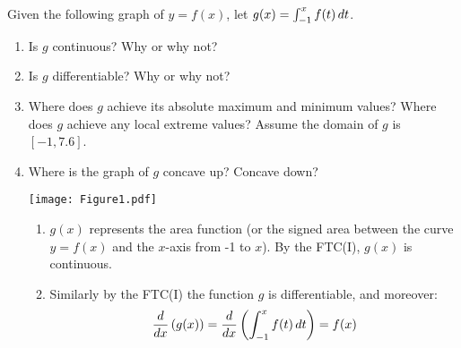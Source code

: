 \documentclass[handout,nooutcomes]{ximera}
\begin{document}
\newpage







\begin{problem}
Given the following graph of $y=f(x)$, let $g(x) = \int_{-1}^x f(t) \,d t$.
	\begin{enumerate}
	
	\item  Is $g$ continuous?  Why or why not?
		
		
		
		
	\item  Is $g$ differentiable?  Why or why not?
		
		
		
		
	\item  Where does $g$ achieve its absolute maximum and minimum values?  Where does $g$ achieve any local extreme values?  Assume the domain of $g$ is $[-1,7.6]$.
		
		
		
		
	\item  Where is the graph of $g$ concave up?  Concave down?
		
		
\begin{image}
\texttt{[image: Figure1.pdf]}
\end{image}

		\begin{freeResponse}
			\begin{enumerate}
			\item  $g(x)$ represents the area function (or the signed area between the curve$y=f(x)$ and the $x$-axis from -1 to $x$).  By the FTC(I), $g(x)$ is continuous.
			
			\item  Similarly by the FTC(I) the function $g$ is differentiable, and moreover:
			$$\frac{d}{dx} \left( g(x) \right) = \frac{d}{dx} \left( \int_{-1}^x f(t) \,d t \right)= f(x)$$
			

\end{enumerate}
\end{freeResponse}
\end{enumerate}
\end{problem}
\end{document}
